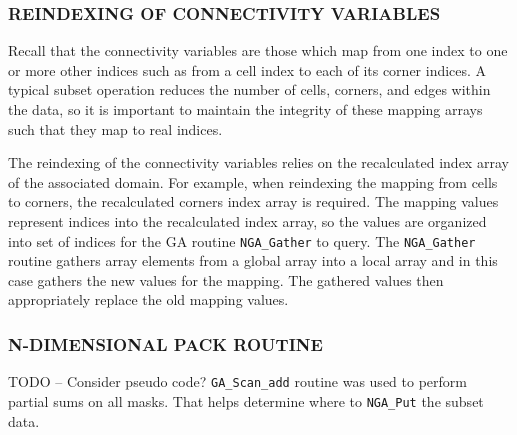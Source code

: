 \subsubsection{REINDEXING OF CONNECTIVITY VARIABLES}

Recall that the connectivity variables are those which map from one index to
one or more other indices such as from a cell index to each of its corner
indices.  A typical subset operation reduces the number of cells, corners, and
edges within the data, so it is important to maintain the integrity of these
mapping arrays such that they map to real indices.

The reindexing of the connectivity variables relies on the recalculated index
array of the associated domain.  For example, when reindexing the mapping from
cells to corners, the recalculated corners index array is required.  The
mapping values represent indices into the recalculated index array, so the
values are organized into set of indices for the GA routine \verb=NGA_Gather=
to query.  The \verb=NGA_Gather= routine gathers array elements from a global
array into a local array and in this case gathers the new values for the
mapping.  The gathered values then appropriately replace the old mapping
values.

\subsubsection{N-DIMENSIONAL PACK ROUTINE}

TODO -- Consider pseudo code?  \verb=GA_Scan_add= routine was used to perform
partial sums on all masks. That helps determine where to \verb=NGA_Put= the
subset data.
